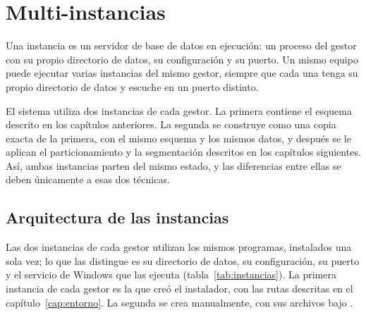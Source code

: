 \chapter{Multi-instancias}
\label{cap:multiinstancias}

Una instancia es un servidor de base de datos en ejecución: un proceso del gestor con su propio directorio de datos, su configuración y su puerto. Un mismo equipo puede ejecutar varias instancias del mismo gestor, siempre que cada una tenga su propio directorio de datos y escuche en un puerto distinto.

El sistema utiliza dos instancias de cada gestor. La primera contiene el esquema descrito en los capítulos anteriores. La segunda se construye como una copia exacta de la primera, con el mismo esquema y los mismos datos, y después se le aplican el particionamiento y la segmentación descritos en los capítulos siguientes. Así, ambas instancias parten del mismo estado, y las diferencias entre ellas se deben únicamente a esas dos técnicas.

\section{Arquitectura de las instancias}

Las dos instancias de cada gestor utilizan los mismos programas, instalados una sola vez; lo que las distingue es su directorio de datos, su configuración, su puerto y el servicio de Windows que las ejecuta (tabla~\ref{tab:instancias}). La primera instancia de cada gestor es la que creó el instalador, con las rutas descritas en el capítulo~\ref{cap:entorno}. La segunda se crea manualmente, con sus archivos bajo .

